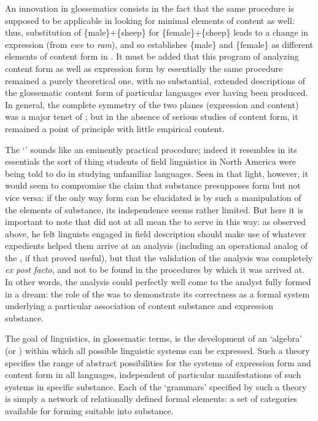 An innovation in glossematics consists in the fact that the same
procedure is supposed to be applicable in looking for minimal elements
of content as well: thus, substitution of \{male\}+\{sheep\} for
\{female\}+\{sheep\} leads to a change in expression (from \emph{ewe}
to \emph{ram}), and so establishes \{male\} and \{female\} as
different elements of content form in . It must be added that
this program of analyzing content form as well as expression form by
essentially the same procedure remained a purely theoretical one, with
no substantial, extended descriptions of the glossematic content form
of particular languages ever having been produced. In general, the
complete symmetry of the two planes (expression and content) was a
major tenet of ; but in the absence of serious
studies of content form, it remained a point of principle with little
empirical content.

The `' sounds like an eminently practical procedure;
indeed it resembles in its essentials the sort of thing students of
field linguistics in North America were being told to do in studying
unfamiliar languages. Seen in that light, however, it would seem to
compromise the claim that substance presupposes form but not vice
versa: if the only way form can be elucidated is by such a
manipulation of the elements of substance, its independence seems
rather limited. But here it is important to note that {\Hjelmslev} did
not at all mean the  to serve in this way: as observed
above, he felt linguists engaged in field description should make use
of whatever expedients helped them arrive at an analysis (including an
operational analog of the , if that proved useful),
but that the validation of the analysis was completely \emph{ex post
  facto}, and not to be found in the procedures by which it was
arrived at. In other words, the analysis could perfectly well come to
the analyst fully formed in a dream: the role of the 
was to demonstrate its correctness as a formal system underlying a
particular association of content substance and expression substance.

The goal of linguistics, in glossematic terms, is the development of
an `algebra' (or ) within which all possible
linguistic systems can be expressed. Such a theory specifies the range
of abstract possibilities for the systems of expression form and
content form in all languages, independent of particular
manifestations of such systems in specific substance. Each of the
`grammars' specified by such a theory is simply a network of
relationally defined formal elements: a set of categories available
for forming suitable  into substance.


